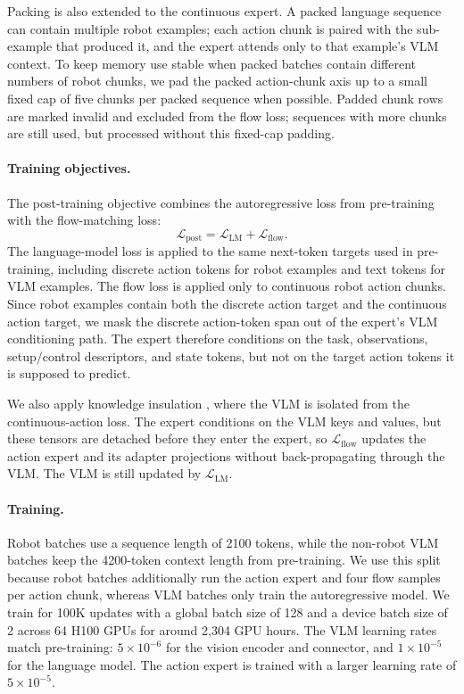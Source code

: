 Packing is also extended to the continuous expert. A packed language sequence can contain multiple robot examples; each action chunk is paired with the sub-example that produced it, and the expert attends only to that example's VLM context. To keep memory use stable when packed batches contain different numbers of robot chunks, we pad the packed action-chunk axis up to a small fixed cap of five chunks per packed sequence when possible. Padded chunk rows are marked invalid and excluded from the flow loss; sequences with more chunks are still used, but processed without this fixed-cap padding.

\paragraph{Training objectives.}
The post-training objective combines the autoregressive loss from pre-training with the flow-matching loss:
\begin{equation}
    \mathcal{L}_{\mathrm{post}}
    =
    \mathcal{L}_{\mathrm{LM}}
    +
    \mathcal{L}_{\mathrm{flow}} .
\end{equation}
The language-model loss is applied to the same next-token targets used in pre-training, including discrete action tokens for robot examples and text tokens for VLM examples. The flow loss is applied only to continuous robot action chunks. Since robot examples contain both the discrete action target and the continuous action target, we mask the discrete action-token span out of the expert's VLM conditioning path. The expert therefore conditions on the task, observations, setup/control descriptors, and state tokens, but not on the target action tokens it is supposed to predict.

We also apply knowledge insulation \citep{driess2025knowledgeinsulation}, where the VLM is isolated from the continuous-action loss. The expert conditions on the VLM keys and values, but these tensors are detached before they enter the expert, so \(\mathcal{L}_{\mathrm{flow}}\) updates the action expert and its adapter projections without back-propagating through the VLM. The VLM is still updated by \(\mathcal{L}_{\mathrm{LM}}\).

\paragraph{Training.}
Robot batches use a sequence length of 2100 tokens, while the non-robot VLM batches keep the 4200-token context length from pre-training. We use this split because robot batches additionally run the action expert and four flow samples per action chunk, whereas VLM batches only train the autoregressive model. We train for 100K updates with a global batch size of 128 and a device batch size of 2 across 64 H100 GPUs for around 2,304 GPU hours. The VLM learning rates match pre-training: \(5\times10^{-6}\) for the vision encoder and connector, and \(1\times10^{-5}\) for the language model. The action expert is trained with a larger learning rate of \(5\times10^{-5}\).

